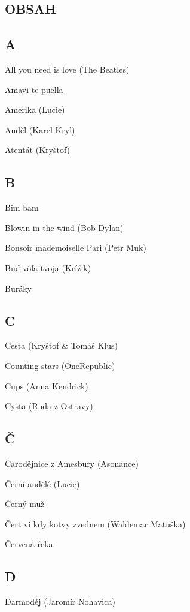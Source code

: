 \begin{LARGE}
    \section*{\Huge OBSAH}
\end{LARGE}

\begin{multicols}{2}

\subsection*{A}
All you need is love (The Beatles)

Amavi te puella

Amerika (Lucie)

Anděl (Karel Kryl)

Atentát (Kryštof)

\subsection*{B}
Bim bam

Blowin in the wind (Bob Dylan)

Bonsoir mademoiselle Pari (Petr Muk)

Buď vôľa tvoja (Krížik)

Buráky

\subsection*{C}
Cesta (Kryštof \& Tomáš Klus)

Counting stars (OneRepublic)

Cups (Anna Kendrick)

Cysta (Ruda z Ostravy)

\subsection*{Č}
Čarodějnice z Amesbury (Asonance)

Černí andělé (Lucie)

Černý muž

Čert ví kdy kotvy zvednem (Waldemar Matuška)

Červená řeka

\subsection*{D}
Darmoděj (Jaromír Nohavica)


\end{multicols}
